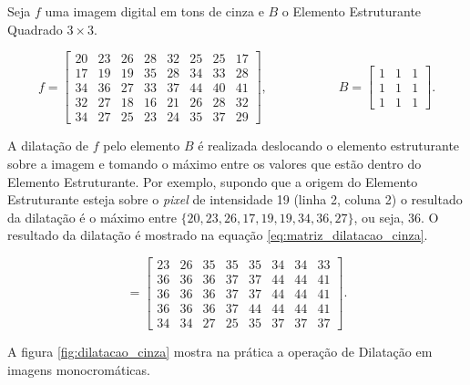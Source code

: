 \begin{exemplo}
	
	Seja $f$ uma imagem digital em tons de cinza e $B$ o Elemento Estruturante Quadrado $3 \times 3$.
	
	\begin{equation}
		f = \begin{bmatrix}
			20 & 23 & 26 & 28 & 32 & 25 & 25 & 17 \\
			17 & 19 & 19 & 35 & 28 & 34 & 33 & 28 \\
			34 & 36 & 27 & 33 & 37 & 44 & 40 & 41 \\
			32 & 27 & 18 & 16 & 21 & 26 & 28 & 32 \\
			34 & 27 & 25 & 23 & 24 & 35 & 37 & 29 
		\end{bmatrix}, \; \; \; \; \; \; \; \; \; \; \; \; \; \; \; \; \; \; \; \;
		B = \begin{bmatrix}
			1 & 1 & 1 \\
			1 & 1 & 1 \\
			1 & 1 & 1 
		\end{bmatrix}.
	\end{equation}
	
	A dilatação de $f$ pelo elemento $B$ é realizada deslocando o elemento estruturante sobre a imagem e tomando o máximo entre os valores que estão dentro do Elemento Estruturante. Por exemplo, supondo que a origem do Elemento Estruturante esteja sobre o \textit{pixel} de intensidade 19 (linha 2, coluna 2) o resultado da dilatação é o máximo entre $\{20, 23, 26, 17, 19, 19, 34, 36, 27\}$, ou seja, 36. O resultado da dilatação é mostrado na equação \ref{eq:matriz_dilatacao_cinza}.
	
	\begin{equation}
		[f \oplus B] = \begin{bmatrix}
			23 & 26 & 35 & 35 & 35 & 34 & 34 & 33 \\
			36 & 36 & 36 & 37 & 37 & 44 & 44 & 41 \\
			36 & 36 & 36 & 37 & 37 & 44 & 44 & 41 \\
			36 & 36 & 36 & 37 & 44 & 44 & 44 & 41 \\
			34 & 34 & 27 & 25 & 35 & 37 & 37 & 37
		\end{bmatrix}.
		\label{eq:matriz_dilatacao_cinza}
	\end{equation}
\end{exemplo}

A figura \ref{fig:dilatacao_cinza} mostra na prática a operação de Dilatação em imagens monocromáticas.

